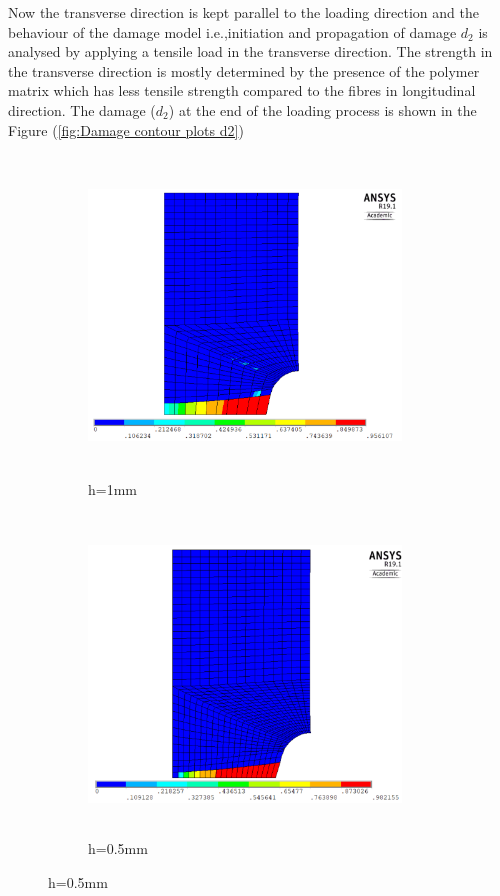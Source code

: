 \documentclass[a4paper,12pt,twoside]{report}
\begin{document}
\FloatBarrier
Now the transverse direction is kept parallel to the loading direction and the behaviour of the damage model i.e.,initiation and propagation of damage $d_{2}$ is analysed by applying a tensile load in the transverse direction. The strength in the transverse direction is mostly determined by the presence of the polymer matrix which has less tensile strength compared to the fibres in longitudinal direction. The damage ($d_{2}$) at the end of the loading process is shown in the Figure (\ref{fig:Damage contour plots d2})\\
\begin{figure}[htbp!]
     \captionsetup[subfigure]{justification=centering}
     \begin{subfigure}{0.4\textwidth}
         \includegraphics[width=8.3cm,height=8.5cm,keepaspectratio]{25.d2-1.png}
         \caption{h=1mm}
         \label{fig:d2-1}
     \end{subfigure}
     \hspace{1.8cm}
     \begin{subfigure}{0.4\textwidth}
         \includegraphics[width=8.3cm,height=8.5cm,keepaspectratio]{25.d2-0.5.png}
         \caption{h=0.5mm}
         \label{fig:d2-0.5}
     \end{subfigure}
\end{figure}
\end{document}
